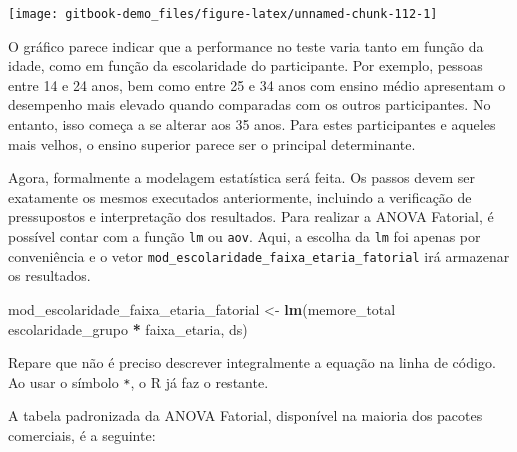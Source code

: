 \documentclass[
]{book}
\newenvironment{Shaded}{\begin{snugshade}}{\end{snugshade}}
\newcommand{\KeywordTok}[1]{\textcolor[rgb]{0.13,0.29,0.53}{\textbf{#1}}}
\newcommand{\NormalTok}[1]{#1}
\newcommand{\OperatorTok}[1]{\textcolor[rgb]{0.81,0.36,0.00}{\textbf{#1}}}
\newcommand{\StringTok}[1]{\textcolor[rgb]{0.31,0.60,0.02}{#1}}
\begin{document}
\begin{center}\texttt{[image: gitbook-demo\_files/figure-latex/unnamed-chunk-112-1]} \end{center}

O gráfico parece indicar que a performance no teste varia tanto em função da idade, como em função da escolaridade do participante. Por exemplo, pessoas entre 14 e 24 anos, bem como entre 25 e 34 anos com ensino médio apresentam o desempenho mais elevado quando comparadas com os outros participantes. No entanto, isso começa a se alterar aos 35 anos. Para estes participantes e aqueles mais velhos, o ensino superior parece ser o principal determinante.

Agora, formalmente a modelagem estatística será feita. Os passos devem ser exatamente os mesmos executados anteriormente, incluindo a verificação de pressupostos e interpretação dos resultados. Para realizar a ANOVA Fatorial, é possível contar com a função \texttt{lm} ou \texttt{aov}. Aqui, a escolha da \texttt{lm} foi apenas por conveniência e o vetor \texttt{mod\_escolaridade\_faixa\_etaria\_fatorial} irá armazenar os resultados.

\begin{Shaded}
\begin{Highlighting}[]
\NormalTok{mod_escolaridade_faixa_etaria_fatorial <-}\StringTok{ }\KeywordTok{lm}\NormalTok{(memore_total }\OperatorTok{~}\StringTok{ }
\StringTok{                                               }\NormalTok{escolaridade_grupo }\OperatorTok{*}\StringTok{ }
\StringTok{                                               }\NormalTok{faixa_etaria, ds)}
\end{Highlighting}
\end{Shaded}

Repare que não é preciso descrever integralmente a equação na linha de código. Ao usar o símbolo \texttt{*}, o R já faz o restante.

A tabela padronizada da ANOVA Fatorial, disponível na maioria dos pacotes comerciais, é a seguinte:
\end{document}
